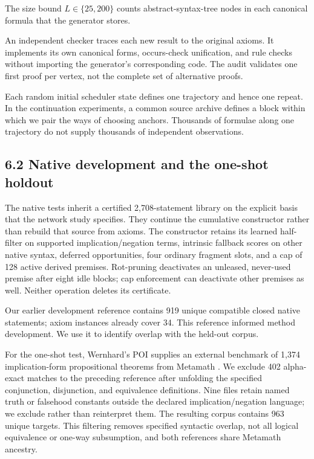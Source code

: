 \documentclass[pdflatex,sn-basic,Numbered]{sn-jnl}
\begin{document}
The size bound \(L \in \{ 25,200\}\) counts abstract-syntax-tree nodes in each canonical formula that the generator stores. 

An independent checker traces each new result to the original axioms. It implements its own canonical forms, occurs-check unification, and rule checks without importing the generator's corresponding code. The audit validates one first proof per vertex, not the complete set of alternative proofs.

Each random initial scheduler state defines one trajectory and hence one repeat. In the continuation experiments, a common source archive defines a block within which we pair the ways of choosing anchors. Thousands of formulae along one trajectory do not supply thousands of independent observations.

\subsection*{6.2 Native development and the one-shot holdout}\label{native-development-and-the-one-shot-holdout}

The native tests inherit a certified 2,708-statement library on the explicit basis that the network study specifies. They continue the cumulative constructor rather than rebuild that source from axioms. The constructor retains its learned half-filter on supported implication/negation terms, intrinsic fallback scores on other native syntax, deferred opportunities, four ordinary fragment slots, and a cap of 128 active derived premises. Rot-pruning deactivates an unleased, never-used premise after eight idle blocks; cap enforcement can deactivate other premises as well. Neither operation deletes its certificate.

Our earlier development reference contains 919 unique compatible closed native statements; axiom instances already cover 34. This reference informed method development. We use it to identify overlap with the held-out corpus.

For the one-shot test, Wernhard's POI supplies an external benchmark of 1,374 implication-form propositional theorems from Metamath \citep{Wernhard2026}. We exclude 402 alpha-exact matches to the preceding reference after unfolding the specified conjunction, disjunction, and equivalence definitions. Nine files retain named truth or falsehood constants outside the declared implication/negation language; we exclude rather than reinterpret them. The resulting corpus contains 963 unique targets. This filtering removes specified syntactic overlap, not all logical equivalence or one-way subsumption, and both references share Metamath ancestry.
\end{document}
